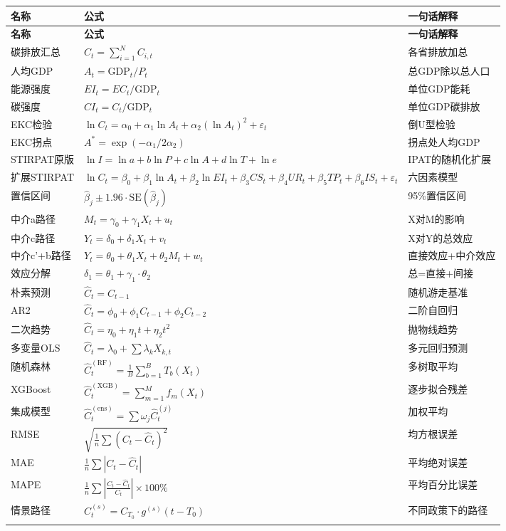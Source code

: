\documentclass[12pt, a4paper]{article}
\begin{document}
\begin{longtable}{p{3cm} p{5.5cm} p{6cm}}
\toprule
\textbf{名称} & \textbf{公式} & \textbf{一句话解释} \\
\midrule
\endfirsthead
\toprule
\textbf{名称} & \textbf{公式} & \textbf{一句话解释} \\
\midrule
\endhead
\bottomrule
\endfoot

碳排放汇总 & $C_t = \sum_{i=1}^{N} C_{i,t}$ & 各省排放加总 \\
人均GDP & $A_t = \text{GDP}_t / P_t$ & 总GDP除以总人口 \\
能源强度 & $EI_t = EC_t / \text{GDP}_t$ & 单位GDP能耗 \\
碳强度 & $CI_t = C_t / \text{GDP}_t$ & 单位GDP碳排放 \\
EKC检验 & $\ln C_t = \alpha_0 + \alpha_1 \ln A_t + \alpha_2(\ln A_t)^2 + \varepsilon_t$ & 倒U型检验 \\
EKC拐点 & $A^* = \exp(-\alpha_1 / 2\alpha_2)$ & 拐点处人均GDP \\
STIRPAT原版 & $\ln I = \ln a + b\ln P + c\ln A + d\ln T + \ln e$ & IPAT的随机化扩展 \\
扩展STIRPAT & $\ln C_t = \beta_0 + \beta_1\ln A_t + \beta_2\ln EI_t + \beta_3 CS_t + \beta_4 UR_t + \beta_5 TP_t + \beta_6 IS_t + \varepsilon_t$ & 六因素模型 \\
置信区间 & $\hat{\beta}_j \pm 1.96 \cdot \text{SE}(\hat{\beta}_j)$ & 95\%置信区间 \\
中介a路径 & $M_t = \gamma_0 + \gamma_1 X_t + u_t$ & X对M的影响 \\
中介c路径 & $Y_t = \delta_0 + \delta_1 X_t + v_t$ & X对Y的总效应 \\
中介c'+b路径 & $Y_t = \theta_0 + \theta_1 X_t + \theta_2 M_t + w_t$ & 直接效应+中介效应 \\
效应分解 & $\delta_1 = \theta_1 + \gamma_1 \cdot \theta_2$ & 总=直接+间接 \\
朴素预测 & $\hat{C}_t = C_{t-1}$ & 随机游走基准 \\
AR2 & $\hat{C}_t = \phi_0 + \phi_1 C_{t-1} + \phi_2 C_{t-2}$ & 二阶自回归 \\
二次趋势 & $\hat{C}_t = \eta_0 + \eta_1 t + \eta_2 t^2$ & 抛物线趋势 \\
多变量OLS & $\hat{C}_t = \lambda_0 + \sum \lambda_k X_{k,t}$ & 多元回归预测 \\
随机森林 & $\hat{C}_t^{(\text{RF})} = \frac{1}{B}\sum_{b=1}^{B} T_b(X_t)$ & 多树取平均 \\
XGBoost & $\hat{C}_t^{(\text{XGB})} = \sum_{m=1}^{M} f_m(X_t)$ & 逐步拟合残差 \\
集成模型 & $\hat{C}_t^{(\text{ens})} = \sum \omega_j \hat{C}_t^{(j)}$ & 加权平均 \\
RMSE & $\sqrt{\frac{1}{n}\sum(C_t - \hat{C}_t)^2}$ & 均方根误差 \\
MAE & $\frac{1}{n}\sum|C_t - \hat{C}_t|$ & 平均绝对误差 \\
MAPE & $\frac{1}{n}\sum\left|\frac{C_t-\hat{C}_t}{C_t}\right|\times100\%$ & 平均百分比误差 \\
情景路径 & $C_t^{(s)} = C_{T_0} \cdot g^{(s)}(t-T_0)$ & 不同政策下的路径 \\
\label{tab:formula}
\end{longtable}
\end{document}
